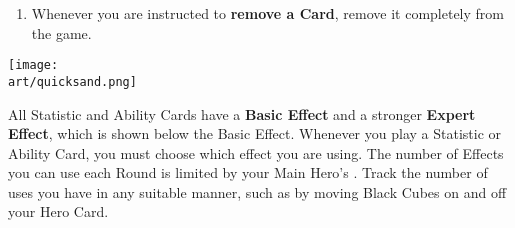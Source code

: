 \begin{multicols}{2}
\begin{enumerate}
  \begin{itemize}
    \item \textbf{Instant}  Effects are resolved immediately.
    \item \textbf{Activation}  Effects must be played when Activating your own Unit in Combat.
    \item \textbf{Map}  Effects cannot be used during Combat.
    \item \textbf{Ongoing}  Effects last until they are used up or until the player who played them starts their next Turn (whichever happens first).
      \begin{expansion}[before skip balanced=0.3em,]{stronghold,conflux,cove}
      \parbox{0.75\hsize}{You can use Time Tokens to track the duration of Ongoing Effects.}
      \end{expansion}
    \item \textbf{Permanent}  Cards stay in play until discarded or replaced.
      They are played the same way as  and  Cards.
      \textbf{You may only have one permanent Card at a time}; playing another discards the first.
      While a Permanent Card is in play, you may use either its Basic or Expert Effect, but not both simultaneously.
  \end{itemize}
  \item Whenever you are instructed to \textbf{remove a Card}, remove it completely from the game.
\end{enumerate}

\vfill
\hfill{\texttt{[image: \\art/quicksand.png]}}

\clearpage


All Statistic and Ability Cards have a \textbf{Basic Effect} and a stronger \textbf{Expert}  \textbf{Effect}, which is shown below the Basic Effect.
Whenever you play a Statistic or Ability Card, you must choose which effect you are using.
The number of  Effects you can use each Round is limited by your Main Hero's .
Track the number of uses you have in any suitable manner, such as by moving Black Cubes on and off your Hero Card.\par


\end{multicols}
